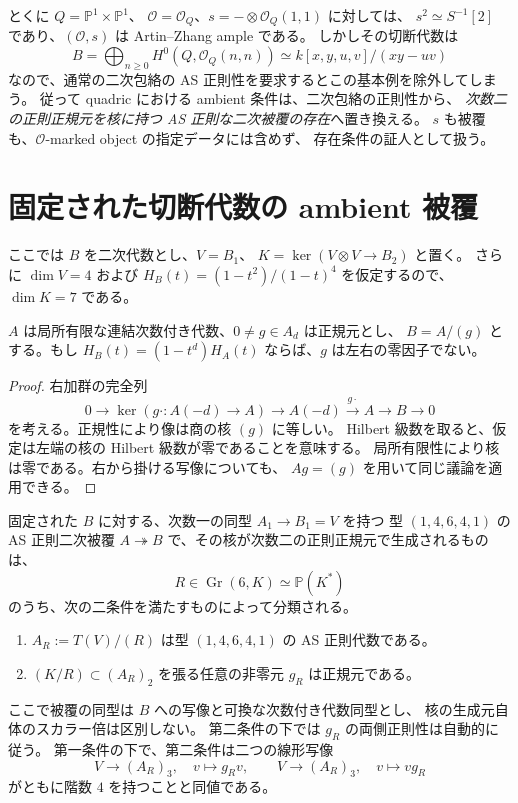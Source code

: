 とくに $Q=\mathbb P^1\times\mathbb P^1$、
$\mathcal O=\mathcal O_Q$、$s=-\otimes\mathcal O_Q(1,1)$ に対しては、
$s^2\simeq S^{-1}[2]$ であり、$(\mathcal O,s)$ は Artin--Zhang ample である。
しかしその切断代数は
\[
 B=\bigoplus_{n\geq0}H^0(Q,\mathcal O_Q(n,n))
   \simeq k[x,y,u,v]/(xy-uv)
\]
なので、通常の二次包絡の AS 正則性を要求するとこの基本例を除外してしまう。
従って quadric における ambient 条件は、二次包絡の正則性から、
\emph{次数二の正則正規元を核に持つ AS 正則な二次被覆の存在}へ置き換える。
$s$ も被覆も、$\mathcal O$-marked object の指定データには含めず、
存在条件の証人として扱う。

\section{固定された切断代数の ambient 被覆}
\label{sec:ambient-incidence}

ここでは $B$ を二次代数とし、$V=B_1$、
$K=\ker(V\otimes V\to B_2)$ と置く。
さらに $\dim V=4$ および
$H_B(t)=(1-t^2)/(1-t)^4$ を仮定するので、$\dim K=7$ である。

\begin{lemma}
\label{lem:normal-hilbert-regular}
$A$ は局所有限な連結次数付き代数、$0\ne g\in A_d$ は正規元とし、
$B=A/(g)$ とする。もし
$H_B(t)=(1-t^d)H_A(t)$ ならば、$g$ は左右の零因子でない。
\end{lemma}

\begin{proof}
右加群の完全列
\[
 0\longrightarrow\ker(g\cdot:A(-d)\to A)
 \longrightarrow A(-d)\xrightarrow{\,g\cdot\,}A
 \longrightarrow B\longrightarrow0
\]
を考える。正規性により像は商の核 $(g)$ に等しい。
Hilbert 級数を取ると、仮定は左端の核の Hilbert 級数が零であることを意味する。
局所有限性により核は零である。右から掛ける写像についても、
$Ag=(g)$ を用いて同じ議論を適用できる。
\end{proof}

\begin{proposition}[被覆の超平面表示]
\label{prop:ambient-hyperplane}
固定された $B$ に対する、次数一の同型 $A_1\to B_1=V$ を持つ
型 $(1,4,6,4,1)$ の AS 正則二次被覆
$A\twoheadrightarrow B$ で、その核が次数二の正則正規元で生成されるものは、
\[
 R\in\operatorname{Gr}(6,K)\simeq\mathbb P(K^*)
\]
のうち、次の二条件を満たすものによって分類される。
\begin{enumerate}
 \item $A_R:=T(V)/(R)$ は型 $(1,4,6,4,1)$ の AS 正則代数である。
 \item $(K/R)\subset(A_R)_2$ を張る任意の非零元 $g_R$ は正規元である。
\end{enumerate}
ここで被覆の同型は $B$ への写像と可換な次数付き代数同型とし、
核の生成元自体のスカラー倍は区別しない。
第二条件の下では $g_R$ の両側正則性は自動的に従う。
第一条件の下で、第二条件は二つの線形写像
\[
 V\longrightarrow(A_R)_3,\quad v\longmapsto g_Rv,
 \qquad
 V\longrightarrow(A_R)_3,\quad v\longmapsto vg_R
\]
がともに階数 $4$ を持つことと同値である。
\end{proposition}

